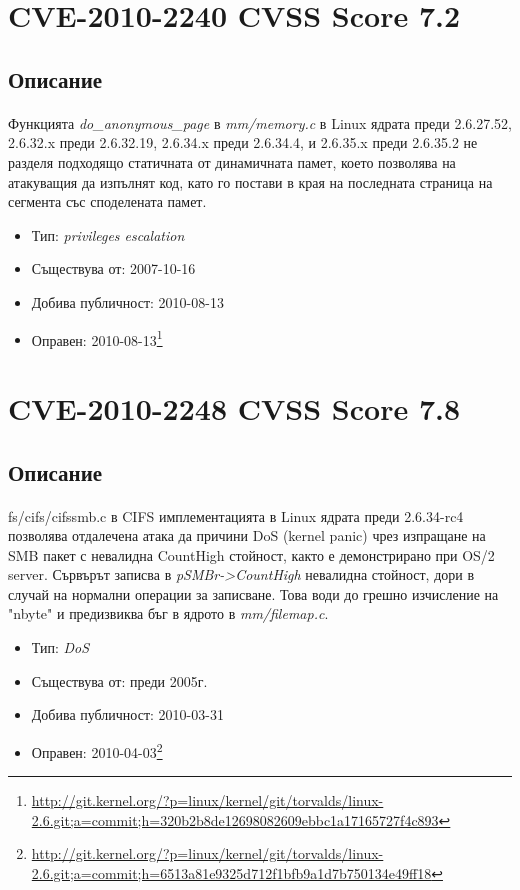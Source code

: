 \documentclass[a4paper,12pt,leqno]{article}
\begin{document}
\section{CVE-2010-2240 CVSS Score 7.2}
\subsection{Описание}
\paragraph{}
Функцията \textit{do\_anonymous\_page} в \textit{mm/memory.c} в Linux ядрата преди 2.6.27.52, 2.6.32.x преди 2.6.32.19, 2.6.34.x преди 2.6.34.4, и 2.6.35.x преди 2.6.35.2 не разделя подходящо статичната от динамичната памет, което позволява на атакуващия да изпълнят код, като го постави в края на последната страница на сегмента със споделената памет.

\begin{itemize}
    \item Тип: \textit{privileges escalation}
    \item Съществува от: 2007-10-16
  	\item Добива публичност: 2010-08-13
    \item Оправен: 2010-08-13\footnote{\url{http://git.kernel.org/?p=linux/kernel/git/torvalds/linux-2.6.git;a=commit;h=320b2b8de12698082609ebbc1a17165727f4c893}}
\end{itemize}

\section{CVE-2010-2248 CVSS Score 7.8}
\subsection{Описание}
\paragraph{}
fs/cifs/cifssmb.c в CIFS имплементацията в Linux ядрата преди 2.6.34-rc4 позволява отдалечена атака да причини DoS (kernel panic) чрез изпращане на SMB пакет с невалидна CountHigh стойност, както е демонстрирано при OS/2 server. Сървърът записва в \textit{pSMBr->CountHigh} невалидна стойност, дори в случай на нормални операции за записване. Това води до грешно изчисление на "nbyte" и предизвиква бъг в ядрото в \textit{mm/filemap.c}.


\begin{itemize}
    \item Тип: \textit{DoS}
    \item Съществува от: преди 2005г.
  	\item Добива публичност: 2010-03-31
    \item Оправен: 2010-04-03\footnote{\url{http://git.kernel.org/?p=linux/kernel/git/torvalds/linux-2.6.git;a=commit;h=6513a81e9325d712f1bfb9a1d7b750134e49ff18}}
\end{itemize}
\end{document}
